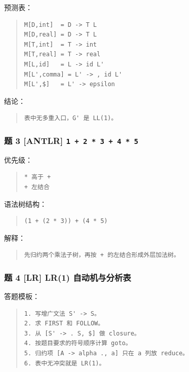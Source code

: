 \documentclass[UTF8,zihao=-4]{ctexart}
\begin{document}
预测表：


\begin{quote}
\footnotesize
\begin{verbatim}
M[D,int]  = D -> T L
M[D,real] = D -> T L
M[T,int]  = T -> int
M[T,real] = T -> real
M[L,id]   = L -> id L'
M[L',comma] = L' -> , id L'
M[L',$]   = L' -> epsilon
\end{verbatim}
\end{quote}


结论：


\begin{quote}
\footnotesize
\begin{verbatim}
表中无多重入口，G' 是 LL(1)。
\end{verbatim}
\end{quote}


\subsubsection{题 3 [ANTLR] \texttt{1 + 2 * 3 + 4 * 5}}


优先级：


\begin{quote}
\footnotesize
\begin{verbatim}
* 高于 +
+ 左结合
\end{verbatim}
\end{quote}


语法树结构：


\begin{quote}
\footnotesize
\begin{verbatim}
(1 + (2 * 3)) + (4 * 5)
\end{verbatim}
\end{quote}


解释：


\begin{quote}
\footnotesize
\begin{verbatim}
先归约两个乘法子树，再按 + 的左结合形成外层加法树。
\end{verbatim}
\end{quote}


\subsubsection{题 4 [LR] LR(1) 自动机与分析表}


答题模板：


\begin{quote}
\footnotesize
\begin{verbatim}
1. 写增广文法 S' -> S。
2. 求 FIRST 和 FOLLOW。
3. 从 [S' -> . S, $] 做 closure。
4. 按题目要求的符号顺序计算 goto。
5. 归约项 [A -> alpha ., a] 只在 a 列放 reduce。
6. 表中无冲突就是 LR(1)。
\end{verbatim}
\end{quote}
\end{document}

